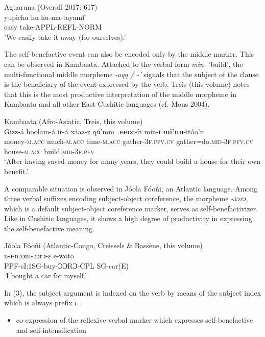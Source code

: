 \documentclass[output=paper]{langsci/langscibook}
\begin{document}
\ea \label{ex:ch1:1}
        Aguaruna (Overall 2017: 617) \\
\gll    yupichu	    hu-hu-ma-tayamɨ  ̃  \\
         easy	    take-APPL-REFL-NORM\\
\glt    'We easily take it away (for ourselves).' 
\z

The self-benefactive event can also be encoded only by the middle marker. This can be observed in Kambaata. Attached to the verbal form \emph{min- }'build', the multi-functional middle morpheme \emph{-aqq / -’} signals that the subject of the clause is the beneficiary of the event expressed by the verb. Treis (this volume) notes that this is the most productive interpretation of the middle morpheme in Kambaata and all other East Cushitic languages (cf. Mous 2004).


\ea\label{ex:treis:2} Kambaata (Afro-Asiatic, Treis, this volume) \\
\gll Gizz-á hoolam-á ir-á xáaz-z qú’mm=\textbf{eecc}-ít min-í         \textbf{mi’nn}-itóo’u\\
     money-\textsc{m.acc} much-\textsc{m.acc} time-\textsc{m.acc} gather-\textsc{3f.pfv.cv} gather=do.\textsc{mid}\textsc{-3f.pfv.cv} house-\textsc{m.acc} build.\textsc{mid}-\textsc{3f.pfv}\\
\glt ‘After having saved money for many years, they could build a house for their own benefit.’
\z

A comparable situation is observed in Jóola  Fóoñi, an Atlantic language. Among three verbal suffixes encoding subject-object coreference, the morpheme \emph{-ɔɔrɔ}, which is a default subject-object coreference marker, serves as self-benefactivizer. Like in Cushitic languages, it shows a high degree of productivity in expressing the self-benefactive meaning. 

\vspace{1cm} %

\ea\label{ex:treis:3} Jóola Fóoñi (Atlantic-Congo, Creissels \& Bassène, this volume) \\
\gll n-ɩ-nɔɔm-ɔɔrɔ-ɛ        e-woto \\
      PPF-sI:1SG-buy-ƆƆRƆ-CPL  SG-car(E) \\
\glt ‘I bought a car for myself.’
\z

In (3), the subject argument is indexed on the verb by means of the subject index which is always prefix \emph{ɩ}.

\begin{itemize}
    \item co-expression of the reflexive verbal marker which expresses self-benefactive and self-intensification 
\end{itemize}
\end{document}
